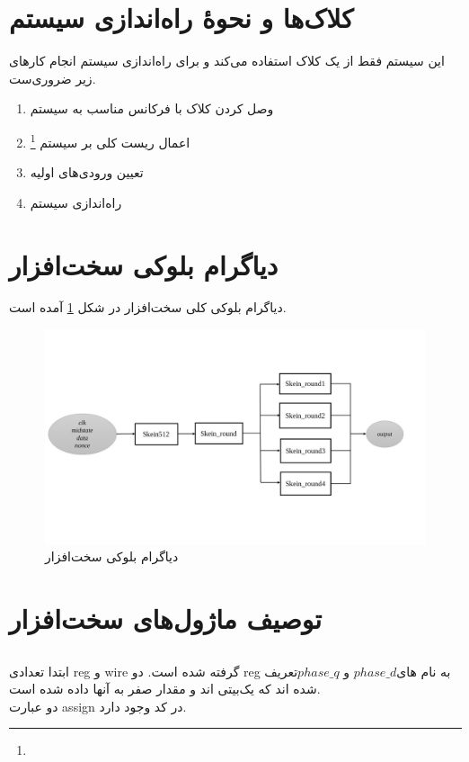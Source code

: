 \section{کلاک‌ها و نحوهٔ راه‌اندازی سیستم}
این سیستم فقط از یک کلاک استفاده می‌کند و برای راه‌اندازی سیستم انجام کارهای زیر ضروری‌ست.
\begin{enumerate}
	\item
	      وصل کردن کلاک با فرکانس مناسب به سیستم
	\item
	      اعمال ریست‌ کلی بر سیستم
	      \footnote{}
	\item 
	      تعیین ورودی‌های اولیه 
	\item 
	      راه‌اندازی سیستم 
\end{enumerate}


\section{دیاگرام بلوکی سخت‌افزار}
دیاگرام بلوکی کلی سخت‌افزار در شکل 
\ref{block_diagram}
آمده است. 

\begin{figure}
	\includegraphics[width = \textwidth]{figs/DescriptionOfSystem/block_diagram.jpg}
	\caption{دیاگرام بلوکی سخت‌افزار}
	\label{block_diagram}
\end{figure}

\section{توصیف ماژول‌های سخت‌افزار}
\subsection{}
ابتدا تعدادی reg و wire گرفته شده است.
دو reg به نام های$ phase\_d$ و $phase\_q $تعریف شده اند که یک‌بیتی اند و مقدار صفر به آنها داده شده است.\\
دو عبارت assign در کد وجود دارد.

